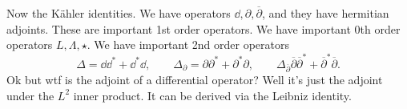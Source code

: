 Now the K\"ahler identities. We have operators $\dd ,\partial ,\overline{\partial } $, and they have hermitian adjoints. These are important 1st order operators. We have important 0th order operators $L,\Lambda ,\star $. We have important 2nd order operators
\[
	\Delta =\dd \dd ^* + \dd ^*\dd ,\qquad \Delta_{\partial } =\partial \partial ^*+\partial ^*\partial ,\qquad \Delta _{\overline{\partial } } \overline{\partial} \overline{\partial } ^* + \overline{\partial } ^* \overline{\partial } 
.\]
Ok but wtf is the adjoint of a differential operator? Well it's just the adjoint under the $L^2$ inner product. It can be derived via the Leibniz identity.
